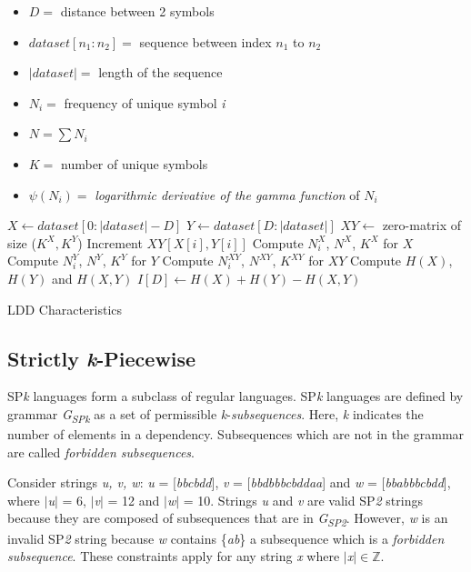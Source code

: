 \documentclass[a0,portrait]{a0poster}
\begin{document}
\begin{multicols}{2}
\begin{multicols}{2}
\begin{itemize}
\item $D=$ distance between 2 symbols
\item $dataset[n_1:n_2]=$ sequence between index $n_1$ to $n_2$
\item $|dataset|=$ length of the sequence
\item $N_i=$ frequency of unique symbol \emph{i}
\item $N = \sum N_i$
\item $K=$ number of unique symbols
\item $\psi(N_i)=$ \emph{logarithmic derivative of the gamma function} of $N_i$
\end{itemize}
\columnbreak
\begin{algorithm}[H]
\begin{algorithmic}
  \State $X \gets dataset[0:|dataset|-D]$
  \State $Y \gets dataset[D:|dataset|]$
  \State $XY \gets$ zero-matrix of size ($K^X,K^Y$)
    \State Increment $XY[X[i],Y[i]]$
  \EndFor
  \State Compute $N_i^X$, $N^X$, $K^X$ for $X$
  \State Compute $N_i^Y$, $N^Y$, $K^Y$ for $Y$
  \State Compute $N_i^{XY}$, $N^{XY}$, $K^{XY}$ for $XY$
  \State Compute $H(X)$, $H(Y)$ and $H(X,Y)$ %
  \State $I[D]\gets H(X)+H(Y)-H(X,Y)$
 \EndFor
\caption{LDD Characteristics}\label{ldd_algo}
\end{algorithmic}
\end{algorithm}
\end{multicols}

\subsection*{Strictly \emph{k}-Piecewise}

SP\emph{k} languages form a subclass of regular languages. SP\emph{k} languages are defined by grammar \emph{G}\textsubscript{\emph{SPk}} as a set of permissible \emph{k}-\emph{subsequences}. Here, \emph{k} indicates the number of elements in a dependency. Subsequences which are not in the grammar are called \emph{forbidden subsequences}.

Consider strings \emph{u, v, w}: \emph{u} = [\emph{bbcbdd}], \emph{v} = [\emph{bbdbbbcbddaa}] and \emph{w} = [\emph{bbabbbcbdd}], where \( \vert \)\emph{u}\( \vert \) = 6, \( \vert \)\emph{v}\( \vert \) = 12 and \( \vert \)\emph{w}\( \vert \) = 10. Strings \emph{u} and \emph{v} are valid SP\emph{2} strings because they are composed of subsequences that are in \emph{G\textsubscript{SP\emph{2}}}. However, \emph{w} is an invalid SP\emph{2} string because \emph{w} contains \{\emph{ab}\} a subsequence which is a \emph{forbidden subsequence}. These constraints apply for any string \emph{x} where \( \vert \)\emph{x}\( \vert \in \mathbb{Z} \).


\end{multicols}
\end{document}

